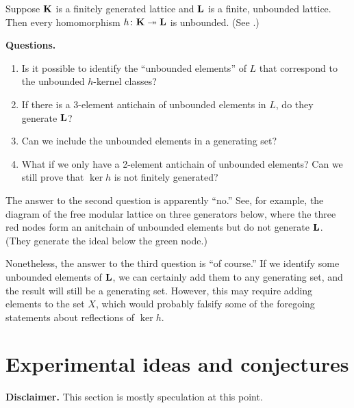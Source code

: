 \newpage

Suppose $\mathbf{K}$ is a finitely generated lattice and $\mathbf{L}$ is a finite, unbounded lattice. 
Then every homomorphism $h \colon \mathbf{K} \twoheadrightarrow  \mathbf{L}$ is unbounded. 
(See \cite[Theorem.~2.13]{MR1319815}.)

\medskip

\noindent \textbf{Questions.}
\begin{enumerate}
  \item Is it possible to identify the ``unbounded elements'' of $L$ that correspond to the unbounded $h$-kernel 
  classes?
  \item If there is a 3-element antichain of unbounded elements in $L$, do they generate $\mathbf{L}$?
  \item Can we include the unbounded elements in a generating set?
  \item What if we only have a 2-element antichain of unbounded elements?  Can we still prove 
  that $\ker h$ is not finitely generated?
\end{enumerate}

\bigskip

The answer to the second question is apparently ``no.'' See, for example, the diagram of the free 
modular lattice on three generators below, where the three red nodes form an anitchain of 
unbounded elements but do not generate $\mathbf{L}$. (They generate the ideal below the green node.)

Nonetheless, the answer to the third question is ``of course.'' 
If we identify some unbounded elements of $\mathbf{L}$, we can certainly add them to any generating set,
and the result will still be a generating set.
However, this may require adding elements to the set $X$, which would probably 
falsify some of the foregoing statements about reflections of $\ker h$.

\bigskip

\section{Experimental ideas and conjectures}
\noindent \textbf{Disclaimer.} This section is mostly speculation at this point.

